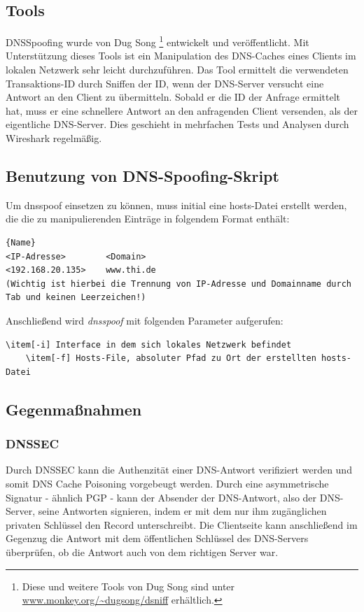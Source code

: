 \subsection*{Tools}
DNSSpoofing wurde von Dug Song \footnote{Diese und weitere Tools von Dug Song sind unter \url{www.monkey.org/~dugsong/dsniff} erhältlich.} entwickelt und veröffentlicht. Mit Unterstützung dieses Tools ist ein Manipulation des DNS-Caches eines Clients im lokalen
Netzwerk sehr leicht durchzuführen. Das Tool ermittelt die verwendeten Transaktions-ID durch Sniffen der ID, wenn der DNS-Server versucht eine Antwort an den Client zu übermitteln. Sobald er die ID der
Anfrage ermittelt hat, muss er eine schnellere Antwort an den anfragenden Client versenden, als der eigentliche DNS-Server. Dies geschieht in mehrfachen Tests und Analysen durch Wireshark regelmäßig. \\

\subsection*{Benutzung von DNS-Spoofing-Skript}
Um dnsspoof einsetzen zu können, muss initial eine hosts-Datei erstellt werden, die die zu manipulierenden Einträge in folgendem Format enthält: \newline

\begin{lstlisting}[caption=Beispiel für eine Hosts-Datei]{Name}
<IP-Adresse>		<Domain>
<192.168.20.135>	www.thi.de
(Wichtig ist hierbei die Trennung von IP-Adresse und Domainname durch Tab und keinen Leerzeichen!)
\end{lstlisting}

Anschließend wird \textit{dnsspoof} mit folgenden Parameter aufgerufen: \newline

\begin{lstlisting}[caption=Parameter für dnsspoof]
	\item[-i] Interface in dem sich lokales Netzwerk befindet
	\item[-f] Hosts-File, absoluter Pfad zu Ort der erstellten hosts-Datei
\end{lstlisting}
	



\subsection*{Gegenmaßnahmen}

\subsubsection*{DNSSEC}
Durch DNSSEC kann die Authenzität einer DNS-Antwort verifiziert werden und somit DNS Cache Poisoning vorgebeugt werden. Durch eine asymmetrische Signatur -  ähnlich PGP - kann der Absender
der DNS-Antwort, also der DNS-Server, seine Antworten signieren, indem er mit dem nur ihm zugänglichen privaten Schlüssel den Record unterschreibt. Die Clientseite kann anschließend im 
Gegenzug die Antwort mit dem öffentlichen Schlüssel des DNS-Servers überprüfen, ob die Antwort auch von dem richtigen Server war.\newpage

